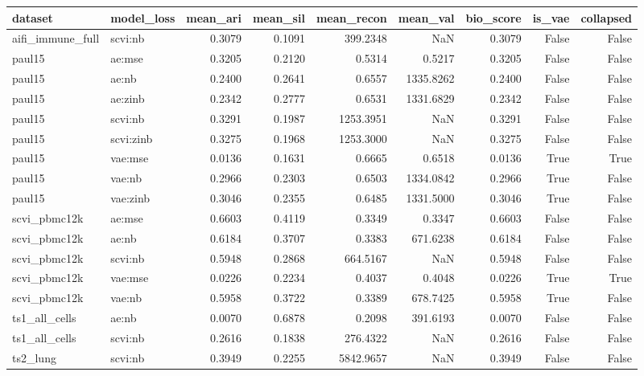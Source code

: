 \begin{tabular}{llrrrrrrr}
\toprule
dataset & model\_loss & mean\_ari & mean\_sil & mean\_recon & mean\_val & bio\_score & is\_vae & collapsed \\
\midrule
aifi\_immune\_full & scvi:nb & 0.3079 & 0.1091 & 399.2348 & NaN & 0.3079 & False & False \\
paul15 & ae:mse & 0.3205 & 0.2120 & 0.5314 & 0.5217 & 0.3205 & False & False \\
paul15 & ae:nb & 0.2400 & 0.2641 & 0.6557 & 1335.8262 & 0.2400 & False & False \\
paul15 & ae:zinb & 0.2342 & 0.2777 & 0.6531 & 1331.6829 & 0.2342 & False & False \\
paul15 & scvi:nb & 0.3291 & 0.1987 & 1253.3951 & NaN & 0.3291 & False & False \\
paul15 & scvi:zinb & 0.3275 & 0.1968 & 1253.3000 & NaN & 0.3275 & False & False \\
paul15 & vae:mse & 0.0136 & 0.1631 & 0.6665 & 0.6518 & 0.0136 & True & True \\
paul15 & vae:nb & 0.2966 & 0.2303 & 0.6503 & 1334.0842 & 0.2966 & True & False \\
paul15 & vae:zinb & 0.3046 & 0.2355 & 0.6485 & 1331.5000 & 0.3046 & True & False \\
scvi\_pbmc12k & ae:mse & 0.6603 & 0.4119 & 0.3349 & 0.3347 & 0.6603 & False & False \\
scvi\_pbmc12k & ae:nb & 0.6184 & 0.3707 & 0.3383 & 671.6238 & 0.6184 & False & False \\
scvi\_pbmc12k & scvi:nb & 0.5948 & 0.2868 & 664.5167 & NaN & 0.5948 & False & False \\
scvi\_pbmc12k & vae:mse & 0.0226 & 0.2234 & 0.4037 & 0.4048 & 0.0226 & True & True \\
scvi\_pbmc12k & vae:nb & 0.5958 & 0.3722 & 0.3389 & 678.7425 & 0.5958 & True & False \\
ts1\_all\_cells & ae:nb & 0.0070 & 0.6878 & 0.2098 & 391.6193 & 0.0070 & False & False \\
ts1\_all\_cells & scvi:nb & 0.2616 & 0.1838 & 276.4322 & NaN & 0.2616 & False & False \\
ts2\_lung & scvi:nb & 0.3949 & 0.2255 & 5842.9657 & NaN & 0.3949 & False & False \\
\bottomrule
\end{tabular}
